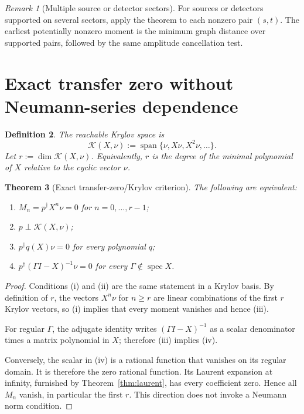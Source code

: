 \documentclass[11pt,a4paper]{article}
\newtheorem{theorem}{Theorem}[section]
\newtheorem{definition}[theorem]{Definition}
\theoremstyle{remark}
\newtheorem{remark}[theorem]{Remark}
\newcommand{\spann}{\operatorname{span}}
\newcommand{\spec}{\operatorname{spec}}
\begin{document}
\begin{remark}[Multiple source or detector sectors]
For sources or detectors supported on several sectors, apply the theorem to
each nonzero pair $(s,t)$.  The earliest potentially nonzero moment is the
minimum graph distance over supported pairs, followed by the same amplitude
cancellation test.
\end{remark}

\section{Exact transfer zero without Neumann-series dependence}

\begin{definition}
The reachable Krylov space is
\[
\mathcal K(X,\nu):=\spann\{\nu,X\nu,X^2\nu,\ldots\}.
\]
Let $r:=\dim\mathcal K(X,\nu)$.  Equivalently, $r$ is the degree of the
minimal polynomial of $X$ relative to the cyclic vector $\nu$.
\end{definition}

\begin{theorem}[Exact transfer-zero/Krylov criterion]
\label{thm:krylov}
The following are equivalent:
\begin{enumerate}[label=(\roman*)]
\item $M_n=p^\dagger X^n\nu=0$ for $n=0,\ldots,r-1$;
\item $p\perp\mathcal K(X,\nu)$;
\item $p^\dagger q(X)\nu=0$ for every polynomial $q$;
\item $p^\dagger(\Gamma I-X)^{-1}\nu=0$ for every
      $\Gamma\notin\spec X$.
\end{enumerate}
\end{theorem}

\begin{proof}
Conditions (i) and (ii) are the same statement in a Krylov basis.  By
definition of $r$, the vectors $X^n\nu$ for $n\ge r$ are linear combinations
of the first $r$ Krylov vectors, so (i) implies that every moment vanishes and
hence (iii).

For regular $\Gamma$, the adjugate identity writes
$(\Gamma I-X)^{-1}$ as a scalar denominator times a matrix polynomial in $X$;
therefore (iii) implies (iv).

Conversely, the scalar in (iv) is a rational function that vanishes on its
regular domain.  It is therefore the zero rational function.  Its Laurent
expansion at infinity, furnished by Theorem~\ref{thm:laurent}, has every
coefficient zero.  Hence all $M_n$ vanish, in particular the first $r$.
This direction does not invoke a Neumann norm condition.
\end{proof}
\end{document}
